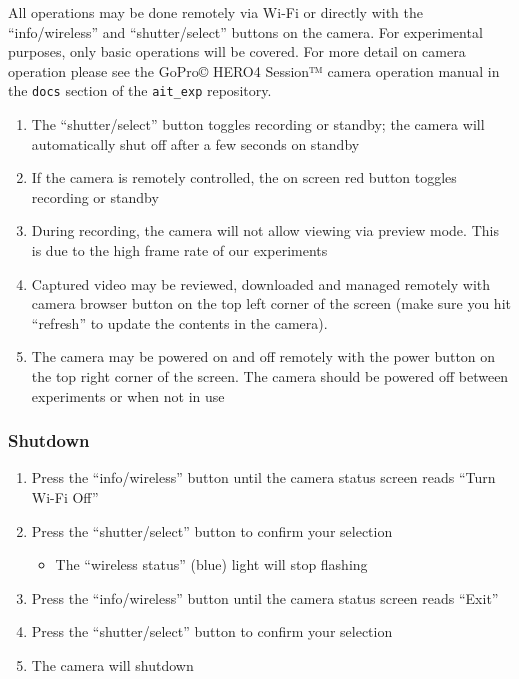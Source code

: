 All operations may be done remotely via Wi-Fi or directly with the
``info/wireless'' and ``shutter/select'' buttons on the camera. For
experimental purposes, only basic operations will be covered. For more
detail on camera operation please see the GoPro© HERO4 Session™ camera
operation manual in the \texttt{docs} section of the \texttt{ait\_exp}
repository.

\begin{enumerate}
\def\labelenumi{\arabic{enumi}.}
\tightlist
\item
  The ``shutter/select'' button toggles recording or standby; the camera
  will automatically shut off after a few seconds on standby
\item
  If the camera is remotely controlled, the on screen red button toggles
  recording or standby
\item
  During recording, the camera will not allow viewing via preview mode.
  This is due to the high frame rate of our experiments
\item
  Captured video may be reviewed, downloaded and managed remotely with
  camera browser button on the top left corner of the screen (make sure
  you hit ``refresh'' to update the contents in the camera).
\item
  The camera may be powered on and off remotely with the power button on
  the top right corner of the screen. The camera should be powered off
  between experiments or when not in use
\end{enumerate}

\hypertarget{shutdown}{%
\subsubsection{Shutdown}\label{shutdown}}

\begin{enumerate}
\def\labelenumi{\arabic{enumi}.}
\item
  Press the ``info/wireless'' button until the camera status screen
  reads ``Turn Wi-Fi Off''
\item
  Press the ``shutter/select'' button to confirm your selection

  \begin{itemize}
  \tightlist
  \item
    The ``wireless status'' (blue) light will stop flashing
  \end{itemize}
\item
  Press the ``info/wireless'' button until the camera status screen
  reads ``Exit''
\item
  Press the ``shutter/select'' button to confirm your selection
\item
  The camera will shutdown
\end{enumerate}

